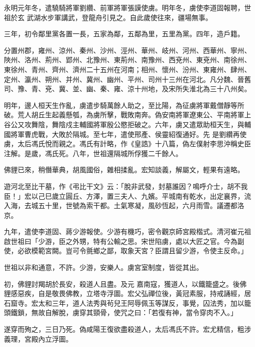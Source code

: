 \begin{pinyinscope}
 永明元年冬，遣驍騎將軍劉纘、前軍將軍張謨使虜。明年冬，虜使李道固報聘，世祖於玄
 武湖水步軍講武，登龍舟引見之。自此歲使往來，疆場無事。



 三年，初令鄰里黨各置一長，五家為鄰，五鄰為里，五里為黨。四年，造戶籍。



 分置州郡，雍州、涼州、秦州、沙州、涇州、華州、岐州、河州、西華州、寧州、陜州、洛州、荊州、郢州、北豫州、東荊州、南豫州、西兗州、東兗州、南徐州、東徐州、青州、齊州、濟州二十五州在河南；相州、懷州、汾州、東雍州、肆州、定州、瀛州、朔州、并州、冀州、幽州、平州、司州十三州在河北。凡分魏、晉舊司、豫、青、兗、冀、並、幽、秦、雍、涼十州地，及宋所失淮北為三十八州矣。



 明年，邊人桓天生作亂，虜遣步騎萬餘人助之，至比陽，為征虜將軍戴僧靜等所破。荒人胡丘生起義懸瓠，為虜所擊，戰敗南奔。偽安南將軍遼東公、平南將軍上谷公又攻舞陰，舞陰戍主輔國將軍殷公愍拒破之。六年，虜又遣眾助桓天生，與輔國將軍曹虎戰，大敗於隔城。至七年，遣使邢產、侯靈紹復通好。先
 是劉纘再使虜，太后馮氏悅而親之。馮氏有計略，作《皇誥》十八篇，偽左僕射李思沖稱史臣注解。是歲，馮氏死。八年，世祖還隔城所俘獲二千餘人。



 佛貍已來，稍僭華典，胡風國俗，雜相揉亂。宏知談義，解屬文，輕果有遠略。



 遊河北至比干墓，作《弔比干文》云：「脫非武發，封墓誰因？鳴呼介士，胡不我臣！」宏以己巳歲立圓丘、方澤，置三夫人、九嬪。平城南有乾水，出定襄界，流入海，去城五十里，世號為索干都。土氣寒凝，風砂恆起，六月雨雪。議遷都洛京。



 九年，遣使李道固、蔣少游報使。少游有機巧，密令觀京師宮殿楷式。清河崔元祖啟世祖曰「少游，臣之外甥，特有公輸之思。宋世陷虜，處以大匠之官。今為副使，必欲模範宮闕。豈可令氈鄉之鄙，取象天宮？臣謂且留少游，令使主反命。」



 世祖以非和通意，不許。少游，安樂人。虜宮室制度，皆從其出。



 初，佛貍討羯胡於長安，殺道人且盡。及元
 嘉南寇，獲道人，以鐵籠盛之。後佛貍感惡疾，自是敬畏佛教，立塔寺浮圖。宏父弘禪位後，黃冠素服，持戒誦經，居石窟寺。宏太和三年，道人法秀與茍兒王阿辱佩玉等謀反，事覺，囚法秀，加以籠頭鐵鎖，無故自解脫，虜穿其頸骨，使咒之曰：「若復有神，當令穿肉不入。」



 遂穿而殉之，三日乃死。偽咸陽王復欲盡殺道人，太后馮氏不許。宏尤精信，粗涉義理，宮殿內立浮圖。




\end{pinyinscope}
